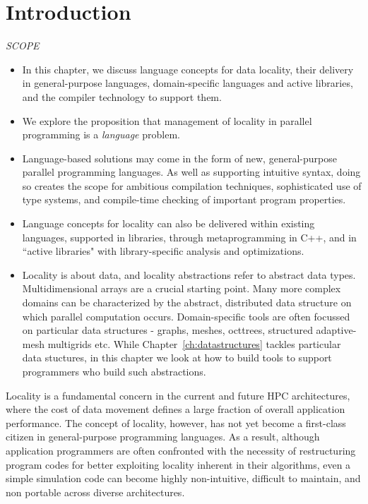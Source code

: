 \section{Introduction}

{\it
SCOPE
  \begin{itemize}
  \item In this chapter, we discuss language concepts for data locality, their delivery in general-purpose languages, domain-specific languages and active libraries, and the compiler technology to support them.
  \item We explore the proposition that management of locality in parallel programming is a \emph{language} problem.
  \item Language-based solutions may come in the form of new, general-purpose parallel programming languages.  As well as supporting intuitive syntax, doing so creates the scope for ambitious compilation techniques, sophisticated use of type systems, and compile-time checking of important program properties.  
  \item Language concepts for locality can also be delivered within existing languages, supported in libraries, through metaprogramming in C++, and in ``active libraries" with library-specific analysis and optimizations.
  \item Locality is about data, and locality abstractions refer to abstract data types.  Multidimensional arrays are a crucial starting point.  Many more complex domains can be characterized by the abstract, distributed data structure on which parallel computation occurs.  Domain-specific tools are often focussed on particular data structures - graphs, meshes, octtrees, structured adaptive-mesh multigrids etc.  While Chapter~\ref{ch:datastructures} tackles particular data stuctures, in this chapter we look at how to build tools to support programmers who build such abstractions.
  \end{itemize}
}

Locality is a fundamental concern in the current and future HPC architectures, where the cost of data movement defines a large fraction of overall application performance. The concept of locality, however, has not yet become a first-class citizen in general-purpose programming languages. As a result, although application programmers are often confronted with the necessity of restructuring program codes for better exploiting locality inherent in their algorithms, even a simple simulation code can become highly non-intuitive, difficult to maintain, and non portable across diverse architectures. 


